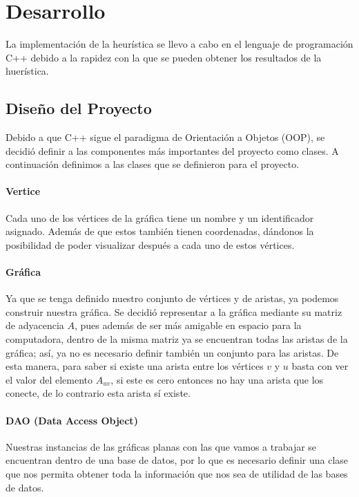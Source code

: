 \documentclass{article}
\begin{document}
  \section{Desarrollo} \label{development}

  La implementación de la heurística se llevo a cabo en el lenguaje
  de programación C++ debido a la rapidez con la que se pueden 
  obtener los resultados de la huerística.

  \subsection{Diseño del Proyecto}
  
  Debido a que C++ sigue el paradigma de Orientación a Objetos (OOP),
  se decidió definir a las componentes más importantes del proyecto 
  como clases. A continuación definimos a las clases que se definieron
  para el proyecto.

  \paragraph{Vertice}

  Cada uno de los vértices de la gráfica tiene un nombre y un identificador
  asignado. Además de que estos también tienen coordenadas, dándonos la 
  posibilidad de poder visualizar después a cada uno de estos vértices.

  \paragraph{Gráfica}

  Ya que se tenga definido nuestro conjunto de vértices y de aristas, ya podemos
  construir nuestra gráfica. Se decidió representar a la gráfica mediante su 
  matriz de adyacencia $A$, pues además de ser más amigable en espacio para la
  computadora, dentro de la misma matriz ya se encuentran todas las aristas de la
  gráfica; así, ya no es necesario definir también un conjunto para las aristas.
  De esta manera, para saber si existe una arista entre los vértices $v$ y $u$
  basta con ver el valor del elemento $A_{uv}$, si este es cero entonces no hay 
  una arista que los conecte, de lo contrario esta arista sí existe.
  
  \paragraph{DAO (Data Access Object)}

  Nuestras instancias de las gráficas planas con las que vamos a trabajar se 
  encuentran dentro de una base de datos, por lo que es necesario definir 
  una clase que nos permita obtener toda la información que nos sea de 
  utilidad de las bases de datos.
\end{document}
